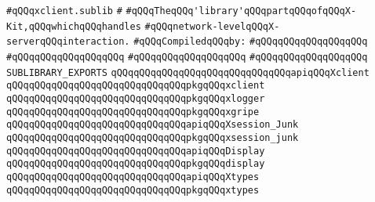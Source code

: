 \label{src/lib/x-kit/xclient/xclient.sublib}
\verb|#qQQqxclient.sublib|\newline
\verb|#|\newline
\verb|#qQQqTheqQQq'library'qQQqpartqQQqofqQQqX-Kit,qQQqwhichqQQqhandles|\newline
\verb|#qQQqnetwork-levelqQQqX-serverqQQqinteraction.|\newline
\newline
\verb|#qQQqCompiledqQQqby:|\newline
\verb|#qQQqqQQqqQQqqQQqqQQq|\newline
\verb|#qQQqqQQqqQQqqQQqqQQq|\newline
\verb|#qQQqqQQqqQQqqQQqqQQq|\newline
\verb|#qQQqqQQqqQQqqQQqqQQq|\newline
\newline
\verb|SUBLIBRARY_EXPORTS|\newline
\newline
\verb|qQQqqQQqqQQqqQQqqQQqqQQqqQQqqQQqapiqQQqXclient|\newline
\verb|qQQqqQQqqQQqqQQqqQQqqQQqqQQqqQQqpkgqQQqxclient|\newline
\newline
\verb|qQQqqQQqqQQqqQQqqQQqqQQqqQQqqQQqpkgqQQqxlogger|\newline
\verb|qQQqqQQqqQQqqQQqqQQqqQQqqQQqqQQqpkgqQQqxgripe|\newline
\newline
\verb|qQQqqQQqqQQqqQQqqQQqqQQqqQQqqQQqapiqQQqXsession_Junk|\newline
\verb|qQQqqQQqqQQqqQQqqQQqqQQqqQQqqQQqpkgqQQqxsession_junk|\newline
\newline
\verb|qQQqqQQqqQQqqQQqqQQqqQQqqQQqqQQqapiqQQqDisplay|\newline
\verb|qQQqqQQqqQQqqQQqqQQqqQQqqQQqqQQqpkgqQQqdisplay|\newline
\newline
\verb|qQQqqQQqqQQqqQQqqQQqqQQqqQQqqQQqapiqQQqXtypes|\newline
\verb|qQQqqQQqqQQqqQQqqQQqqQQqqQQqqQQqpkgqQQqxtypes|\newline
\newline
